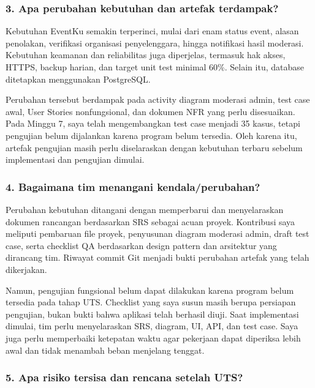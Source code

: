 \documentclass[11pt,a4paper]{article}
\begin{document}
\subsubsection*{3. Apa perubahan kebutuhan dan artefak terdampak?}

Kebutuhan EventKu semakin terperinci, mulai dari enam status event, alasan penolakan, verifikasi organisasi penyelenggara, hingga notifikasi hasil moderasi. Kebutuhan keamanan dan reliabilitas juga diperjelas, termasuk hak akses, HTTPS, backup harian, dan target unit test minimal 60\%. Selain itu, database ditetapkan menggunakan PostgreSQL.

Perubahan tersebut berdampak pada activity diagram moderasi admin, test case awal, User Stories nonfungsional, dan dokumen NFR yang perlu disesuaikan. Pada Minggu 7, saya telah mengembangkan test case menjadi 35 kasus, tetapi pengujian belum dijalankan karena program belum tersedia. Oleh karena itu, artefak pengujian masih perlu diselaraskan dengan kebutuhan terbaru sebelum implementasi dan pengujian dimulai.



\subsubsection*{4. Bagaimana tim menangani kendala/perubahan?}

Perubahan kebutuhan ditangani dengan memperbarui dan menyelaraskan dokumen rancangan berdasarkan SRS sebagai acuan proyek. Kontribusi saya meliputi pembaruan file proyek, penyusunan diagram moderasi admin, draft test case, serta checklist QA berdasarkan design pattern dan arsitektur yang dirancang tim. Riwayat commit Git menjadi bukti perubahan artefak yang telah dikerjakan.

Namun, pengujian fungsional belum dapat dilakukan karena program belum tersedia pada tahap UTS. Checklist yang saya susun masih berupa persiapan pengujian, bukan bukti bahwa aplikasi telah berhasil diuji. Saat implementasi dimulai, tim perlu menyelaraskan SRS, diagram, UI, API, dan test case. Saya juga perlu memperbaiki ketepatan waktu agar pekerjaan dapat diperiksa lebih awal dan tidak menambah beban menjelang tenggat.



\subsubsection*{5. Apa risiko tersisa dan rencana setelah UTS?}
\end{document}
